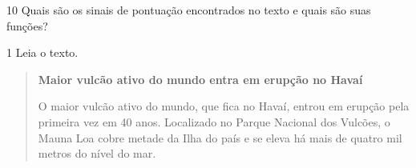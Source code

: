 
\pagebreak
\num{10} Quais são os sinais de pontuação encontrados no texto e quais são
suas funções?




\num{1} Leia o texto.

\begin{quote}
\textbf{Maior vulcão ativo do mundo entra em erupção no Havaí}

O maior vulcão ativo do mundo, que fica no Havaí, entrou em erupção pela primeira vez em 40 anos. Localizado no Parque Nacional dos Vulcões, o Mauna Loa cobre metade da Ilha do país e se eleva há mais de quatro mil metros do nível do mar.
\end{quote}

